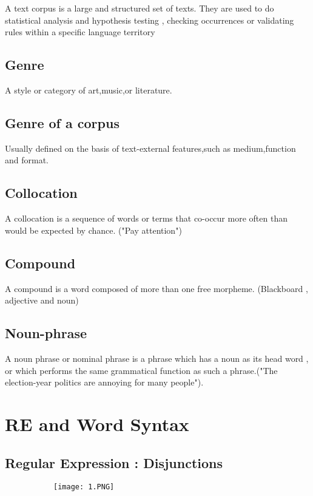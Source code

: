 \documentclass{article}
\begin{document}
A text corpus is a large and structured set of texts. They are used to do statistical analysis and hypothesis testing , checking occurrences or validating rules within a specific language territory

\subsection{Genre}

A style or category of art,music,or literature.

\subsection{Genre of a corpus}

Usually defined on the basis of text-external features,such as medium,function and format.

\subsection{Collocation}

A collocation is a sequence of words or terms that co-occur more often than would be expected by chance. ("Pay attention")

\subsection{Compound}

A compound is a word composed of more than one free morpheme. (Blackboard , adjective and noun)

\subsection{Noun-phrase}

A noun phrase or nominal phrase is a phrase which has a noun as its head word , or which performs the same grammatical function as such a phrase.("The election-year politics are annoying for many people").


\section{RE and Word Syntax}
\subsection{Regular Expression : Disjunctions}

\begin{figure}[ht!]
  \centering
  \begin{subfigure}[b]{0.8\linewidth}
    \texttt{[image: 1.PNG]}
  \end{subfigure}
\end{figure}
\end{document}
